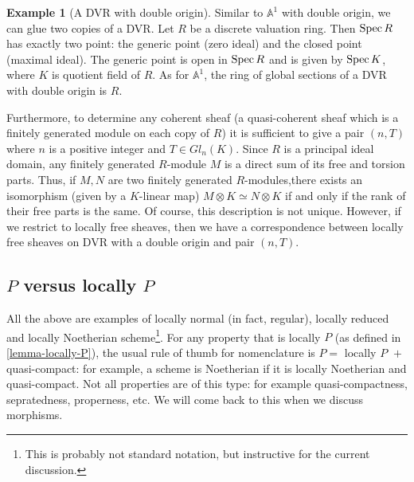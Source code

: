 \documentclass[11pt]{amsart}
\newcommand{\Spec}{{\rm Spec \,}}
\newcommand{\A}{{\mathbb A}}
\theoremstyle{definition}
\newtheorem{example}[theorem]{Example}
\begin{document}
\begin{example}[A DVR with double origin] Similar to $\A^1$ with double origin, we can glue two copies of a DVR. Let $R$ be a discrete valuation ring. Then $\Spec R$ has exactly two point: the generic point (zero ideal) and the closed point (maximal ideal). The generic point is open in $\Spec R$ and is given by $\Spec K$, where $K$ is quotient field of $R$. As for $\A^1$, the ring of global sections of a DVR with double origin is $R$.

Furthermore, to determine any coherent sheaf (a quasi-coherent sheaf which is a finitely generated module on each copy of $R$) it is sufficient to give a pair $(n,T)$ where $n$ is a positive integer and $T\in Gl_n(K)$. Since $R$ is a principal ideal domain, any finitely generated $R$-module $M$ is a direct sum of its free and torsion parts. Thus, if $M, N$ are two finitely generated $R$-modules,there exists an isomorphism (given by a $K$-linear map) $M\otimes K \simeq N\otimes K$ if and only if the rank of their free parts is the same. Of course, this description is not unique. However, if we restrict to locally free sheaves, then we have a correspondence between locally free sheaves on DVR with a double origin and pair $(n,T)$.
\end{example}

\begin{comment}
\begin{tikzcd}[remember picture]
	A \arrow[r] & B\\
	C \arrow[r] & D\\
\end{tikzcd}
\begin{tikzpicture}[overlay,remember picture]
\path (\tikzcdmatrixname-2-1) to node[midway,sloped]{$\subseteq$}
(\tikzcdmatrixname-1-1);
\path (\tikzcdmatrixname-2-2) to node[midway,sloped]{$\subseteq$}
(\tikzcdmatrixname-1-2);
\end{tikzpicture}
\end{comment}

\subsection{\texorpdfstring{$P$}{P} versus locally \texorpdfstring{$P$}{P}}\label{PvlP}
All the above are examples of locally normal (in fact, regular), locally reduced and locally Noetherian scheme\footnote{This is probably not standard notation, but instructive for the current discussion.}. For any property that is locally $P$ (as defined in \ref{lemma-locally-P}), the usual rule of thumb for nomenclature is $P=$ locally $P\,\,+$ quasi-compact: for example, a scheme is Noetherian if it is locally Noetherian and quasi-compact. Not all properties are of this type: for example quasi-compactness, sepratedness, properness, etc. We will come back to this when we discuss morphisms.
\end{document}
